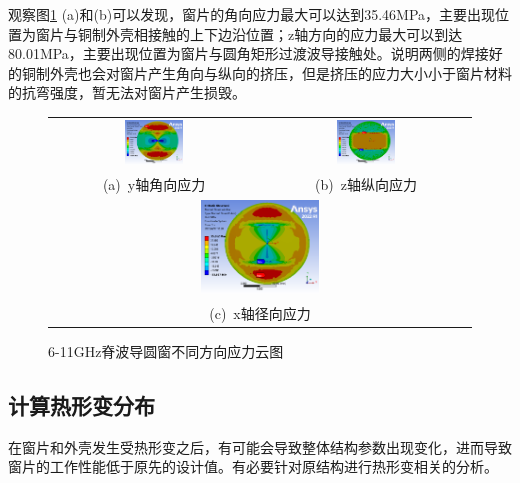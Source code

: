 \documentclass[master]{thesis-uestc}
\begin{document}
观察图\ref{fig:X输入不同方向应力分布} (a)和(b)可以发现，窗片的角向应力最大可以达到35.46MPa，主要出现位置为窗片与铜制外壳相接触的上下边沿位置；z轴方向的应力最大可以到达80.01MPa，主要出现位置为窗片与圆角矩形过渡波导接触处。说明两侧的焊接好的铜制外壳也会对窗片产生角向与纵向的挤压，但是挤压的应力大小小于窗片材料的抗弯强度，暂无法对窗片产生损毁。
\begin{figure}[!htb]
    \small
    \centering
    \begin{tabular}{@{\ }c@{\ }c}
        \includegraphics[width=0.29\textwidth]{pic/chapter3/Xy轴角向应力.png} & 
        \hspace{5pt}
        \includegraphics[width=0.29\textwidth]{pic/chapter3/Xz轴纵向应力.png}     \\
        \mbox{\small (a) y轴角向应力}                                                                               & 
        \mbox{\small (b) z轴纵向应力}                                                           \\[6bp]
        \multicolumn{2}{c}{\includegraphics[width=0.29\textwidth]{pic/chapter3/Xx轴径向应力.png}} \\  %
        \multicolumn{2}{c}{\mbox{\small (c) x轴径向应力}}             
    \end{tabular}
    \caption{6-11GHz脊波导圆窗不同方向应力云图}
    \label{fig:X输入不同方向应力分布}
\end{figure}

\subsection{计算热形变分布}
在窗片和外壳发生受热形变之后，有可能会导致整体结构参数出现变化，进而导致窗片的工作性能低于原先的设计值。有必要针对原结构进行热形变相关的分析。
\end{document}
